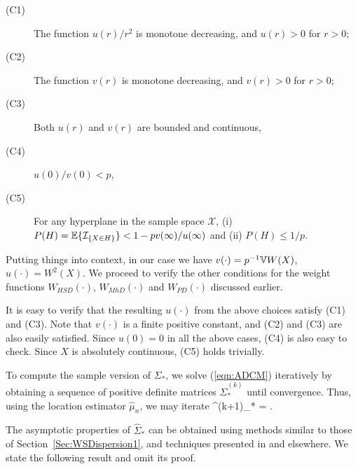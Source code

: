 \begin{description}
\item[(C1)] The function $u(r)/r^2$ is monotone decreasing, 
and $u(r)>0$ for $r > 0$;

\item[(C2)]  The function $v(r)$ is monotone decreasing, and 
$v(r) > 0$ for $r > 0$;

\item[(C3)] Both $u(r)$ and $v(r)$ are bounded and continuous,

\item[(C4)] $u(0) / v(0) < p$,

\item[(C5)] For any hyperplane in the sample space $\mathcal X$, 
(i) $P(H) = {\mathbb{E}} \{ \mathcal{I}_{\{X \in H \}} \} < 1 - p v(\infty) / u(\infty)$ and 
(ii) $P(H) \leq 1/p$.
\end{description}

Putting things into context, in our case we have 
$v (\cdot) = p^{-1}{\mathbb{V}} W (X)$, 
$u (\cdot) = W^{2}(X)$. 
We proceed to verify the other conditions for the weight functions 
$W_{HSD} (\cdot)$, 
$W_{MhD} (\cdot)$ and $W_{PD} (\cdot)$ discussed earlier.

It is easy to verify that the resulting $u (\cdot)$ from the above choices 
satisfy (C1) and (C3). 
Note that $v (\cdot)$ is a finite positive constant, 
and (C2) and (C3) are also easily satisfied. 
Since $u (0) = 0$ in all the above cases, (C4) is also easy to check. Since $X$ is 
absolutely continuous, (C5) holds trivially.

To compute the sample version of $\Sigma_{*}$, we solve (\ref{eqn:ADCM}) 
iteratively by obtaining a sequence of positive definite matrices 
$\hat{\Sigma}^{(k)}_{*}$ until convergence. Thus, using the location 
estimator $\hat{\mu}_{n}$, we may iterate
%
\ban
\hat{\Sigma}^{(k+1)}_{*}  = 
\BE {}.
\ean
%

The asymptotic properties of $\hat{\Sigma}_{*}$ can be obtained using methods similar 
to those of Section~\ref{Sec:WSDispersion1}, and techniques presented in 
\cite{ref:Biometrika00603_CrouxHaesbroeck} and elsewhere. We state the following result and omit its proof.

